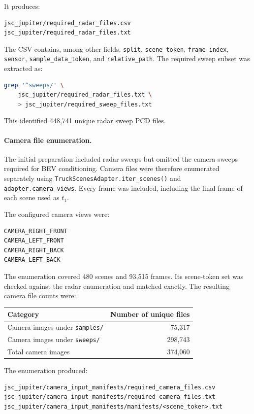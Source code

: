 \documentclass[11pt,a4paper]{article}
\begin{document}
It produces:
\begin{lstlisting}
jsc_jupiter/required_radar_files.csv
jsc_jupiter/required_radar_files.txt
\end{lstlisting}

The CSV contains, among other fields,
\texttt{split}, \texttt{scene\_token}, \texttt{frame\_index},
\texttt{sensor}, \texttt{sample\_data\_token}, and
\texttt{relative\_path}. The required sweep subset was extracted as:
\begin{lstlisting}[language=bash]
grep '^sweeps/' \
    jsc_jupiter/required_radar_files.txt \
    > jsc_jupiter/required_sweep_files.txt
\end{lstlisting}

This identified 448,741 unique radar sweep PCD files.

\paragraph{Camera file enumeration.}

The initial preparation included radar sweeps but omitted the camera
sweeps required for BEV conditioning. Camera files were therefore
enumerated separately using
\texttt{TruckScenesAdapter.iter\_scenes()} and
\texttt{adapter.camera\_views}. Every frame was included, including
the final frame of each scene used as $t_1$.

The configured camera views were:
\begin{lstlisting}
CAMERA_RIGHT_FRONT
CAMERA_LEFT_FRONT
CAMERA_RIGHT_BACK
CAMERA_LEFT_BACK
\end{lstlisting}

The enumeration covered 480 scenes and 93,515 frames. Its scene-token
set was checked against the radar enumeration and matched exactly.
The resulting camera file counts were:
\begin{center}
\begin{tabular}{lr}
\hline
Category & Number of unique files \\
\hline
Camera images under \texttt{samples/} & 75,317 \\
Camera images under \texttt{sweeps/}  & 298,743 \\
Total camera images                 & 374,060 \\
\hline
\end{tabular}
\end{center}

The enumeration produced:
\begin{lstlisting}
jsc_jupiter/camera_input_manifests/required_camera_files.csv
jsc_jupiter/camera_input_manifests/required_camera_files.txt
jsc_jupiter/camera_input_manifests/manifests/<scene_token>.txt
\end{lstlisting}
\end{document}
